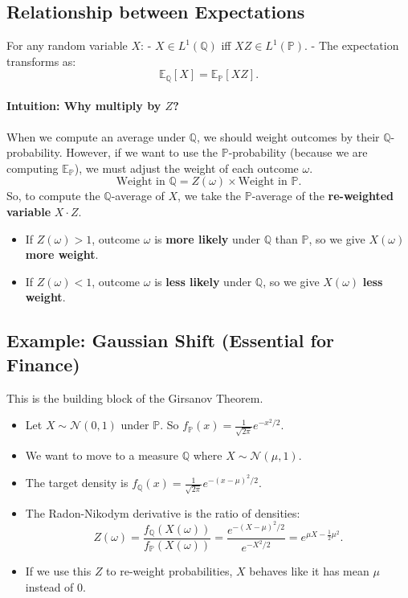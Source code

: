 \subsection{Relationship between Expectations}
For any random variable $X$:
- $X \in L^1(\mathbb{Q})$ iff $XZ \in L^1(\mathbb{P})$.
- The expectation transforms as:
\[
\mathbb{E}_{\mathbb{Q}}[X] = \mathbb{E}_{\mathbb{P}}[X Z].
\]

\paragraph{Intuition: Why multiply by \texorpdfstring{$Z$}{Z}?}
When we compute an average under $\mathbb{Q}$, we should weight outcomes by their $\mathbb{Q}$-probability. However, if we want to use the $\mathbb{P}$-probability (because we are computing $\mathbb{E}_{\mathbb{P}}$), we must adjust the weight of each outcome $\omega$.
\[
\text{Weight in } \mathbb{Q} = Z(\omega) \times \text{Weight in } \mathbb{P}.
\]
So, to compute the $\mathbb{Q}$-average of $X$, we take the $\mathbb{P}$-average of the \textbf{re-weighted variable} $X \cdot Z$.
\begin{itemize}
    \item If $Z(\omega) > 1$, outcome $\omega$ is \textbf{more likely} under $\mathbb{Q}$ than $\mathbb{P}$, so we give $X(\omega)$ \textbf{more weight}.
    \item If $Z(\omega) < 1$, outcome $\omega$ is \textbf{less likely} under $\mathbb{Q}$, so we give $X(\omega)$ \textbf{less weight}.
\end{itemize}

\subsection{Example: Gaussian Shift (Essential for Finance)}
This is the building block of the Girsanov Theorem.
\begin{itemize}
    \item Let $X \sim \mathcal{N}(0, 1)$ under $\mathbb{P}$. So $f_{\mathbb{P}}(x) = \frac{1}{\sqrt{2\pi}} e^{-x^2/2}$.
    \item We want to move to a measure $\mathbb{Q}$ where $X \sim \mathcal{N}(\mu, 1)$.
    \item The target density is $f_{\mathbb{Q}}(x) = \frac{1}{\sqrt{2\pi}} e^{-(x-\mu)^2/2}$.
    \item The Radon-Nikodym derivative is the ratio of densities:
    \[
    Z(\omega) = \frac{f_{\mathbb{Q}}(X(\omega))}{f_{\mathbb{P}}(X(\omega))} = \frac{e^{-(X-\mu)^2/2}}{e^{-X^2/2}} = e^{\mu X - \frac{1}{2}\mu^2}.
    \]
    \item If we use this $Z$ to re-weight probabilities, $X$ behaves like it has mean $\mu$ instead of $0$.
\end{itemize}

